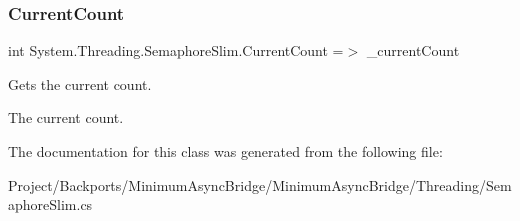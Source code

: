 \subsubsection{\texorpdfstring{Current\+Count}{CurrentCount}}
{\footnotesize\ttfamily int System.\+Threading.\+Semaphore\+Slim.\+Current\+Count =$>$ \+\_\+current\+Count}



Gets the current count. 

The current count.

The documentation for this class was generated from the following file\+:\begin{DoxyCompactItemize}
\item 
Project/\+Backports/\+Minimum\+Async\+Bridge/\+Minimum\+Async\+Bridge/\+Threading/Semaphore\+Slim.\+cs\end{DoxyCompactItemize}
